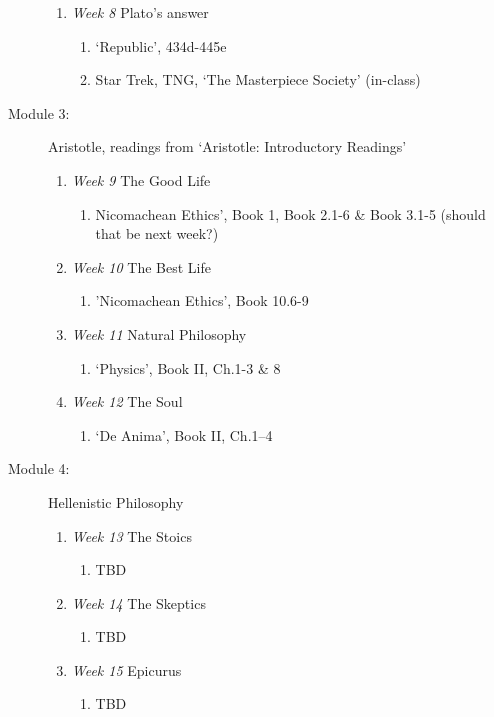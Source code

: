\documentclass[article,oneside]{memoir}
\begin{document}
\begin{description}
\begin{enumerate}
\item \textit{Week 8} Plato's answer
\begin{enumerate}
\item `Republic', 434d-445e
\item Star Trek, TNG, `The Masterpiece Society' (in-class)
\end{enumerate}
\end{enumerate}

\item[Module 3:] Aristotle, readings from `Aristotle: Introductory Readings'
\begin{enumerate}
\item \textit{Week 9}  The Good Life
\begin{enumerate}
\item Nicomachean Ethics', Book 1, Book 2.1-6 \& Book 3.1-5 (should that be next week?)
\end{enumerate}
\item  \textit{Week 10} The Best Life
\begin{enumerate}
\item 'Nicomachean Ethics', Book 10.6-9
\end{enumerate}

\item \textit{Week 11} Natural Philosophy
\begin{enumerate}
\item `Physics', Book II, Ch.1-3 \& 8
\end{enumerate}
\item \textit{Week 12} The Soul
\begin{enumerate}
\item `De Anima', Book II, Ch.1--4
\end{enumerate}
\end{enumerate}

\item[Module 4:] Hellenistic Philosophy
\begin{enumerate} 
\item \textit{Week 13} The Stoics
\begin{enumerate}
\item TBD
\end{enumerate}
\item \textit{Week 14} The Skeptics
\begin{enumerate}
 \item TBD
\end{enumerate}
\item \textit{Week 15} Epicurus
\begin{enumerate}
\item TBD
\end{enumerate}
\end{enumerate}
\end{description}
\end{document}
